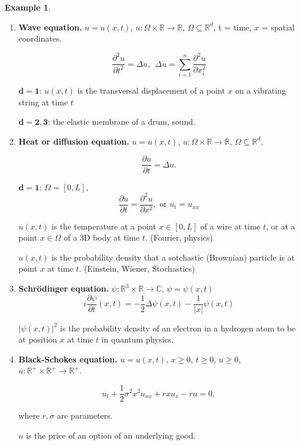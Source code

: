 \documentclass[12pt]{article}
\theoremstyle{definition}
\newtheorem*{warning}{Warning}
\newtheorem*{example*}{Example}
\begin{document}
\begin{example*}
\begin{enumerate}[label=\alph*)]
It is of $2^\text{nd}$ order, linear.

\begin{warning}
In general, linear combinations of solutions are not solutions!
\end{warning}

\item \textbf{Wave equation.} $u=u(x,t)$, $u:\Omega\times\mathbb R\rightarrow\mathbb R$, $\Omega\subseteq\mathbb R^d$, t = time, $x$ = spatial coordinates.

\[\frac{\partial^2u}{\partial t^2}=\Delta u,\ \ \Delta u=\sum_{i=1}^n\frac{\partial^2u}{\partial x_i^2}\]

$\boldsymbol{d=1}$: $u(x,t)$ is the transversal displacement of a point $x$ on a vibrating string at time $t$

$\boldsymbol{d=2,3}$: the elastic membrane of a drum, sound.

\item \textbf{Heat or diffusion equation.} $u=u(x,t)$, $u:\Omega\times\mathbb R\rightarrow\mathbb R$, $\Omega\subseteq\mathbb R^d$.

\[\frac{\partial u}{\partial t}=\Delta u.\]

$\boldsymbol{d=1}$: $\Omega=[0,L]$,
\[\frac{\partial u}{\partial t}=\frac{\partial^2u}{\partial x^2},\text{ or }u_t=u_{xx}\]

$u(x,t)$ is the temperature at a point $x\in[0,L]$ of a wire at time $t$, or at a point $x\in\Omega$ of a 3D body at time $t$. (Fourier, physics)

$u(x,t)$ is the probability density that a sotchastic (Brownian) particle is at point $x$ at time $t$. (Einstein, Wiener, Stochastics)

\item \textbf{Schr\"odinger equation.} $\psi:\mathbb R^3\times\mathbb R\rightarrow\mathbb C$, $\psi=\psi(x,t)$
\[i\frac{\partial\psi}{\partial t}(x,t)=-\frac12\Delta\psi(x,t)-\frac1{|x|}\psi(x,t)\]

$|\psi(x,t)|^2$ is the probability density of an electron in a hydrogen atom to be at position $x$ at time $t$ in quantum physics.

\item \textbf{Black-Schokes equation.} $u=u(x,t)$, $x\geq0$, $t\geq0$, $u\geq0$, $u:\mathbb R^+\times\mathbb R^+\rightarrow\mathbb R^+$.

\[u_t+\frac12\sigma^2x^2u_{xx}+rxu_x-ru=0,\]

where $r,\sigma$ are parameters.

$u$ is the price of an option of an underlying good.


\end{enumerate}
\end{example*}
\end{document}
